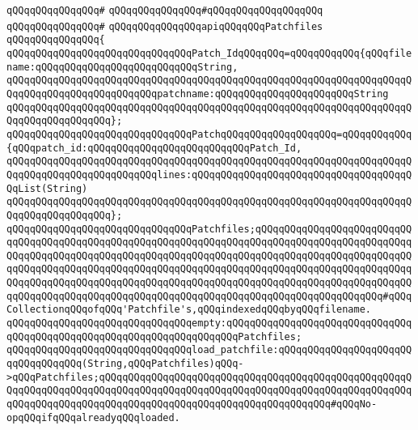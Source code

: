 \verb|qQQqqQQqqQQqqQQq#|\newline
\verb|qQQqqQQqqQQqqQQq#qQQqqQQqqQQqqQQqqQQq|\newline
\verb|qQQqqQQqqQQqqQQq#|\newline
\verb|qQQqqQQqqQQqqQQqapiqQQqqQQqPatchfiles|\newline
\verb|qQQqqQQqqQQqqQQq{|\newline
\verb|qQQqqQQqqQQqqQQqqQQqqQQqqQQqqQQqPatch_IdqQQqqQQq=qQQqqQQqqQQq{qQQqfilename:qQQqqQQqqQQqqQQqqQQqqQQqqQQqString,|\newline
\verb|qQQqqQQqqQQqqQQqqQQqqQQqqQQqqQQqqQQqqQQqqQQqqQQqqQQqqQQqqQQqqQQqqQQqqQQqqQQqqQQqqQQqqQQqqQQqqQQqpatchname:qQQqqQQqqQQqqQQqqQQqqQQqString|\newline
\verb|qQQqqQQqqQQqqQQqqQQqqQQqqQQqqQQqqQQqqQQqqQQqqQQqqQQqqQQqqQQqqQQqqQQqqQQqqQQqqQQqqQQqqQQq};|\newline
\newline
\verb|qQQqqQQqqQQqqQQqqQQqqQQqqQQqqQQqPatchqQQqqQQqqQQqqQQqqQQq=qQQqqQQqqQQq{qQQqpatch_id:qQQqqQQqqQQqqQQqqQQqqQQqqQQqPatch_Id,|\newline
\verb|qQQqqQQqqQQqqQQqqQQqqQQqqQQqqQQqqQQqqQQqqQQqqQQqqQQqqQQqqQQqqQQqqQQqqQQqqQQqqQQqqQQqqQQqqQQqqQQqlines:qQQqqQQqqQQqqQQqqQQqqQQqqQQqqQQqqQQqqQQqList(String)|\newline
\verb|qQQqqQQqqQQqqQQqqQQqqQQqqQQqqQQqqQQqqQQqqQQqqQQqqQQqqQQqqQQqqQQqqQQqqQQqqQQqqQQqqQQqqQQq};|\newline
\newline
\verb|qQQqqQQqqQQqqQQqqQQqqQQqqQQqqQQqPatchfiles;qQQqqQQqqQQqqQQqqQQqqQQqqQQqqQQqqQQqqQQqqQQqqQQqqQQqqQQqqQQqqQQqqQQqqQQqqQQqqQQqqQQqqQQqqQQqqQQqqQQqqQQqqQQqqQQqqQQqqQQqqQQqqQQqqQQqqQQqqQQqqQQqqQQqqQQqqQQqqQQqqQQqqQQqqQQqqQQqqQQqqQQqqQQqqQQqqQQqqQQqqQQqqQQqqQQqqQQqqQQqqQQqqQQqqQQqqQQqqQQqqQQqqQQqqQQqqQQqqQQqqQQqqQQqqQQqqQQqqQQqqQQqqQQqqQQqqQQqqQQqqQQqqQQqqQQqqQQqqQQqqQQqqQQqqQQqqQQqqQQqqQQqqQQqqQQqqQQqqQQqqQQqqQQqqQQq#qQQqCollectionqQQqofqQQq'Patchfile's,qQQqindexedqQQqbyqQQqfilename.|\newline
\newline
\verb|qQQqqQQqqQQqqQQqqQQqqQQqqQQqqQQqempty:qQQqqQQqqQQqqQQqqQQqqQQqqQQqqQQqqQQqqQQqqQQqqQQqqQQqqQQqqQQqqQQqqQQqqQQqPatchfiles;|\newline
\newline
\verb|qQQqqQQqqQQqqQQqqQQqqQQqqQQqqQQqload_patchfile:qQQqqQQqqQQqqQQqqQQqqQQqqQQqqQQqqQQq(String,qQQqPatchfiles)qQQq->qQQqPatchfiles;qQQqqQQqqQQqqQQqqQQqqQQqqQQqqQQqqQQqqQQqqQQqqQQqqQQqqQQqqQQqqQQqqQQqqQQqqQQqqQQqqQQqqQQqqQQqqQQqqQQqqQQqqQQqqQQqqQQqqQQqqQQqqQQqqQQqqQQqqQQqqQQqqQQqqQQqqQQqqQQqqQQqqQQqqQQqqQQqqQQq#qQQqNo-opqQQqifqQQqalreadyqQQqloaded.|\newline
